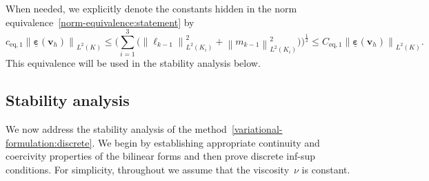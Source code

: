 \documentclass[a4paper,twoside,10pt]{article}
\theoremstyle{plain}
\theoremstyle{remark}
\theoremstyle{definition}
\numberwithin{equation}{section}
\numberwithin{figure}{section}
\newcommand{\Norm}[1]{{\left\|{#1} \right\|}}
\newcommand{\K}{K}
\newcommand{\vbfh}{\mathbf{v}_h}
\newcommand{\Ltwo}{L^2}
\newcommand{\epsbfun}{\underline{\boldsymbol{\varepsilon}}}
\newcommand{\lkmo}{\ell_{k-1}}
\newcommand{\mkmo}{m_{k-1}}
\newcommand{\Ki}{{\K_i}}
\newcommand{\ceqone}{c_{\text{eq},1}}
\newcommand{\Ceqone}{C_{\text{eq},1}}
\begin{document}
When needed,
we explicitly denote the constants hidden
in the norm equivalence~\eqref{norm-equivalence:statement} by
\begin{equation} \label{norm-equivalence:explicit-constants}
\ceqone\Norm{\epsbfun(\vbfh)}_{\Ltwo(\K)}
\leq \Big(\sum_{i = 1}^3\big(\Norm{\lkmo}_{\Ltwo(\Ki)}^2 + \Norm{\mkmo}_{\Ltwo(\Ki)}^2\big)\Big)^{\frac12}
\leq \Ceqone\Norm{\epsbfun(\vbfh)}_{\Ltwo(\K)}.
\end{equation}
This equivalence will be used in the stability analysis below.

\subsection{Stability analysis} \label{subsection:stability}
We now address the stability analysis of the method~\eqref{variational-formulation:discrete}.
We begin by establishing appropriate continuity and coercivity properties
of the bilinear forms
and then prove discrete inf-sup conditions.
For simplicity,
throughout we assume that the viscosity~$\nu$ is constant.
\end{document}
